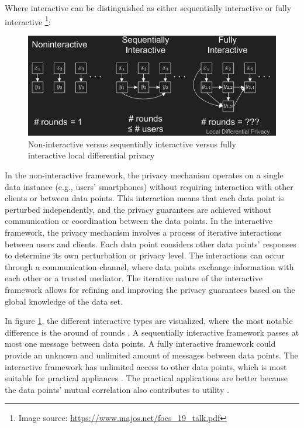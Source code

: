 Where interactive can be distinguished as either sequentially interactive or fully interactive \footnote{Image source: \url{https://www.majos.net/focs_19_talk.pdf}}:
\begin{figure}[H]
  \includegraphics[width=\textwidth]{TheorethicalFramework/nont-interactive-versus-interactive.png}
  \caption{Non-interactive versus sequentially interactive versus fully interactive local differential privacy \citep{joseph_role_2019-1}}
  \label{fig:non-interactive-versus-interactive}
\end{figure}
In the non-interactive framework, the privacy mechanism operates on a single data instance (e.g., users’ smartphones) without requiring interaction with other clients or between data points.
This interaction means that each data point is perturbed independently, and the privacy guarantees are achieved without communication or coordination between the data points.
In the interactive framework, the privacy mechanism involves a process of iterative interactions between users and clients.
Each data point considers other data points' responses to determine its own perturbation or privacy level.
The interactions can occur through a communication channel, where data points exchange information with each other or a trusted mediator.
The iterative nature of the interactive framework allows for refining and improving the privacy guarantees based on the global knowledge of the data set.

In figure \ref{fig:non-interactive-versus-interactive}, the different interactive types are visualized, where the most notable difference is the around of rounds \citep{xiongComprehensiveSurveyLocal2020}.
A sequentially interactive framework passes at most one message between data points.
A fully interactive framework could provide an unknown and unlimited amount of messages between data points.
The interactive framework has unlimited access to other data points, which is most suitable for practical appliances \citep{xiongComprehensiveSurveyLocal2020}.
The practical applications are better because the data points' mutual correlation also contributes to utility \citep{wang_comprehensive_2020}.

